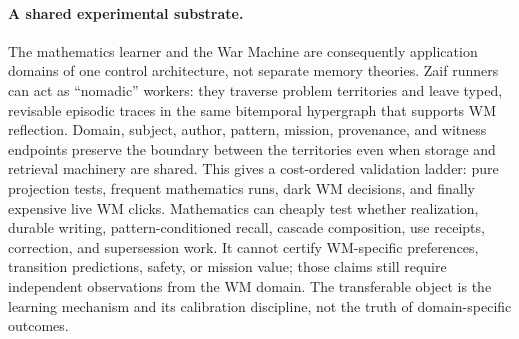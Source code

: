 \paragraph{A shared experimental substrate.} The mathematics learner and the War Machine are consequently application domains of one control architecture, not separate memory theories.  Zaif runners can act as ``nomadic'' workers: they traverse problem territories and leave typed, revisable episodic traces in the same bitemporal hypergraph that supports WM reflection.  Domain, subject, author, pattern, mission, provenance, and witness endpoints preserve the boundary between the territories even when storage and retrieval machinery are shared.  This gives a cost-ordered validation ladder: pure projection tests, frequent mathematics runs, dark WM decisions, and finally expensive live WM clicks.  Mathematics can cheaply test whether realization, durable writing, pattern-conditioned recall, cascade composition, use receipts, correction, and supersession work.  It cannot certify WM-specific preferences, transition predictions, safety, or mission value; those claims still require independent observations from the WM domain.  The transferable object is the learning mechanism and its calibration discipline, not the truth of domain-specific outcomes.
